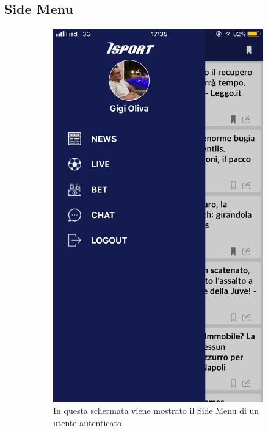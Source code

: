 \documentclass[numbers=noenddot, 12pt, a4paper, oneside]{scrbook}
\begin{document}
\subsection*{Side Menu}
\begin{figure}[H]
	\begin{subfigure}{.5\textwidth}
		\centering
		\includegraphics[width=.8\linewidth]{images/Screen/SideMenu}
		\caption{In questa schermata viene mostrato il Side Menu di un utente autenticato}
	\end{subfigure}
	\begin{subfigure}{.5\textwidth}
		\centering

\end{subfigure}
\end{figure}
\end{document}
